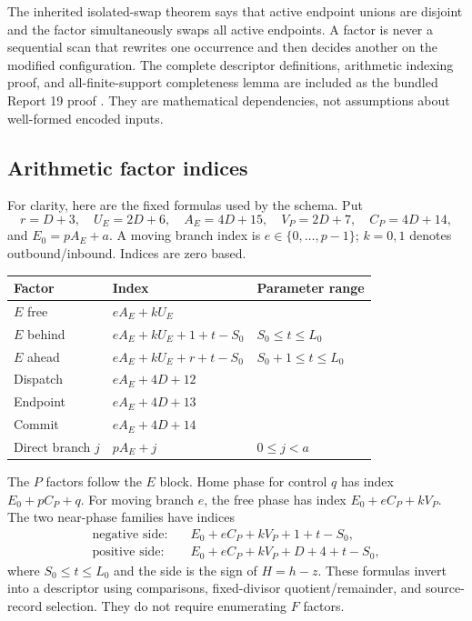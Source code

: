 \documentclass[11pt,a4paper]{article}
\numberwithin{equation}{section}
\begin{document}
The inherited isolated-swap theorem says that active endpoint unions are disjoint and the factor simultaneously swaps all active endpoints. A factor is never a sequential scan that rewrites one occurrence and then decides another on the modified configuration. The complete descriptor definitions, arithmetic indexing proof, and all-finite-support completeness lemma are included as the bundled Report 19 proof \cite{fpa:r19}. They are mathematical dependencies, not assumptions about well-formed encoded inputs.

\subsection{Arithmetic factor indices}
For clarity, here are the fixed formulas used by the schema. Put
\[
r=D+3,\quad U_E=2D+6,\quad A_E=4D+15,
\quad V_P=2D+7,\quad C_P=4D+14,
\]
and $E_0=pA_E+a$. A moving branch index is $e\in\{0,\ldots,p-1\}$; $k=0,1$ denotes outbound/inbound. Indices are zero based.
\begin{center}\small
\begin{tabular}{@{}lll@{}}\toprule
Factor & Index & Parameter range\\\midrule
$E$ free & $eA_E+kU_E$ & \\
$E$ behind & $eA_E+kU_E+1+t-S_0$ & $S_0\leq t\leq L_0$\\
$E$ ahead & $eA_E+kU_E+r+t-S_0$ & $S_0+1\leq t\leq L_0$\\
Dispatch & $eA_E+4D+12$ & \\
Endpoint & $eA_E+4D+13$ & \\
Commit & $eA_E+4D+14$ & \\
Direct branch $j$ & $pA_E+j$ & $0\leq j<a$\\\bottomrule
\end{tabular}
\end{center}
The $P$ factors follow the $E$ block. Home phase for control $q$ has index $E_0+pC_P+q$. For moving branch $e$, the free phase has index $E_0+eC_P+kV_P$. The two near-phase families have indices
\begin{align*}
\text{negative side:}&\quad E_0+eC_P+kV_P+1+t-S_0,\\
\text{positive side:}&\quad E_0+eC_P+kV_P+D+4+t-S_0,
\end{align*}
where $S_0\leq t\leq L_0$ and the side is the sign of $H=h-z$. These formulas invert into a descriptor using comparisons, fixed-divisor quotient/remainder, and source-record selection. They do not require enumerating $F$ factors.
\end{document}
